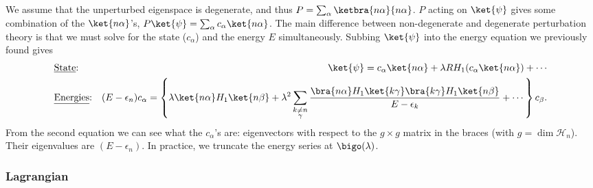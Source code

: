 \documentclass[11pt]{article}
\begin{document}
\begin{eexample}
    We assume that the unperturbed eigenspace is degenerate,
    and thus $P = \sum_\alpha \ketbra{n\alpha}{n\alpha}$.
    $P$ acting on $\ket{\psi}$ gives some combination of
    the $\ket{n\alpha}$'s, $P\ket{\psi} = \sum_\alpha c_\alpha \ket{n\alpha}$.
    The main difference between non-degenerate and degenerate
    perturbation theory is that we must solve for the state ($c_\alpha$)
    and the energy $E$ simultaneously. Subbing $\ket{\psi}$ into the energy
    equation we previously found gives
    \begin{align*}
        & \text{\underline{State}:} & \ket{\psi} = c_\alpha \ket{n\alpha} + \lambda R H_1 (c_\alpha \ket{n\alpha}) + \cdots\\
        & \text{\underline{Energies}:} & (E - \epsilon_n) c_\alpha = \left\{ \lambda \ket{n\alpha}H_1 \ket{n\beta} + \lambda^2 \sum_{\substack{k \neq n \\ \gamma}} \frac{\bra{n\alpha} H_1 \ket{k\gamma} \bra{k\gamma} H_1 \ket{n\beta}}{E - \epsilon_k} + \cdots \right\} c_\beta.
    \end{align*}
    From the second equation we can see what the $c_\alpha$'s are:
    eigenvectors with respect to the $g \times g$ matrix in the braces
    (with $g = \dim{\mathcal{H}_n}$). Their eigenvalues are $(E - \epsilon_n)$.
    In practice, we truncate the energy series at $\bigo(\lambda)$.

\end{eexample}

\begin{eexample}
\end{eexample}







\subsubsection{Lagrangian}
\end{document}
